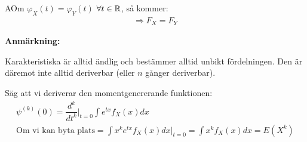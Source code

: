 \newpage
\begin{theo}
  AOm $\varphi_X(t) = \varphi_Y(t)$ $\forall t\in\mathbb{R}$, så kommer:
  \begin{equation*}
    \begin{gathered}
      \Rightarrow F_X=F_Y
    \end{gathered}
  \end{equation*}
\end{theo}
\par\bigskip
\noindent\textbf{Anmärkning:}\par
\noindent Karakteristiska är alltid ändlig och bestämmer alltid unbikt fördelningen. Den är däremot inte alltid deriverbar (eller $n$ gånger deriverbar).
\par\bigskip
\noindent Säg att vi deriverar den momentgenererande funktionen:
\begin{equation*}
  \begin{gathered}
    \psi^{(k)}(0) = \dfrac{d^k}{dt^k}|_{t=0}\int e^{tx}f_X(x)dx\\
    \text{Om vi kan byta plats} = \int x^ke^{tx}f_X(x)dx|_{t=0} = \int x^kf_X(x)dx = E(X^k)
  \end{gathered}
\end{equation*}
\par\bigskip
